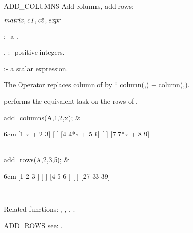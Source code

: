 \begin{Operator}[addcolumns]{ADD_COLUMNS}
Add columns, add rows: 


\begin{Syntax}
\(\meta{matrix},\meta{c1},\meta{c2},\meta{expr}\)
\end{Syntax}

 :- a . 

, :- positive integers. 

 :- a scalar expression. 

The Operator  replaces column  of 
  by  * column(,) +
column(,).

 performs the equivalent task on the rows of 
.

\begin{Examples}

add_columns(A,1,2,x); &
\begin{multilineoutput}{6cm}
[1   x + 2   3]
[             ]
[4  4*x + 5  6]
[             ]
[7  7*x + 8  9]
\end{multilineoutput} \\

add_rows(A,2,3,5); & 
\begin{multilineoutput}{6cm}
[1   2   3 ]
[          ]
[4   5   6 ]
[          ]
[27  33  39]
\end{multilineoutput} \\

\end{Examples}

Related functions: , 
, , 
.

\end{Operator}


\begin{Operator}[addrows]{ADD_ROWS}
 see: .
\end{Operator}


